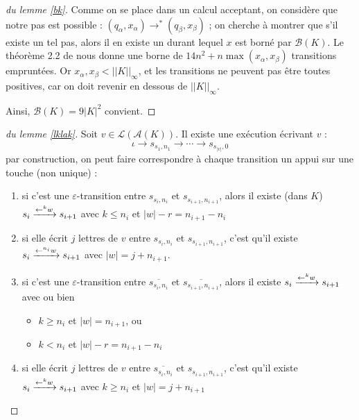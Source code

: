 \documentclass[12pt, a4paper]{article}
\renewcommand{\L}{\mathcal{L}}
\renewcommand{\bar}{\overline}
\newcommand{\A}{\mathcal{A}}
\newcommand{\Kinf}{||K||_{\infty}}
\begin{document}
\begin{proof}[du lemme \ref{bk}]
        Comme on se place dans un calcul acceptant, on considère que notre pas est possible : $(q_\alpha,x_\alpha) \rightarrow^* (q_\beta,x_\beta)$ ; on cherche à montrer que s'il existe un tel pas, alors il en existe un durant lequel $x$ est borné par $\mathcal{B}(K)$.
        Le théorème 2.2 de \cite{shortpathOCS} nous donne une borne de $14n^2 + n \max (x_\alpha,x_\beta)$ transitions empruntées. Or $x_\alpha,x_\beta < \Kinf$, et les transitions ne peuvent pas être toutes positives, car on doit revenir en dessous de $\Kinf$.
        
        Ainsi, $\mathcal{B}(K) = 9|K|^2$ convient.
       
    \end{proof}
    \begin{proof}[du lemme \ref{lklak}]
       Soit $v \in \L(\A(K))$. Il existe une exécution écrivant $v$ :
       \[ \iota \rightarrow s_{s_1,n_1} \rightarrow \cdots \rightarrow s_{s_{|v|},0} \]
       par construction, on peut faire correspondre à chaque transition un appui sur une touche (non unique) :
       \begin{enumerate}
        \item si c'est une $\varepsilon$-transition entre $s_{s_i, n_i}$ et $s_{s_{i+1},n_{i+1}}$, alors il existe (dans $K$) $s_i \xrightarrow{\mathord{\leftarrow}^{k}w} s_{i+1}$ avec $k \leqslant n_i$ et $|w| - r = n_{i+1} - n_i$
        \item si elle écrit $j$ lettres de $v$ entre $s_{s_i,n_i}$ et $s_{s_{i+1},n_{i+1}}$, c'est qu'il existe $s_i \xrightarrow{\mathord{\leftarrow}^{n_i}w} s_{i+1}$ avec $|w| = j + n_{i+1}$.
        \item si c'est une $\varepsilon$-transition entre $\bar{s_{s_i, n_i}}$ et $\bar{s_{s_{i+1},n_{i+1}}}$, alors il existe $s_i \xrightarrow{\mathord{\leftarrow}^{k}w} s_{i+1}$ avec ou bien
            \begin{itemize}
                \item $k \geqslant n_i$ et $|w| = n_{i+1}$, ou
                \item $k < n_i$ et $|w| - r = n_{i+1} - n_i$
            \end{itemize}
        \item si elle écrit $j$ lettres de $v$ entre $\bar{s_{s_i,n_i}}$ et $s_{s_{i+1},n_{i+1}}$, c'est qu'il existe $s_i \xrightarrow{\mathord{\leftarrow}^{k}w} s_{i+1}$ avec $k \geqslant n_i$ et $|w| = j + n_{i+1}$

\end{enumerate}
\end{proof}
\end{document}
